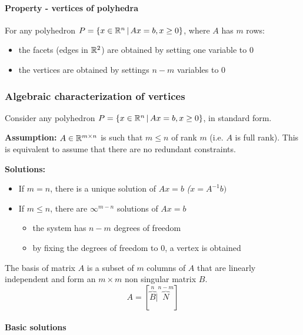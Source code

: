 \documentclass[english]{article}
\begin{document}
\paragraph{Property - vertices of polyhedra}

For any polyhedron \(P = \left\{ x \in \mathbb{R}^n \, | \, Ax = b, x \geq 0 \right\}\), where \(A\) has \(m\) rows:

\begin{itemize}
  \item the facets (edges in \(\mathbb{R}^2\)) are obtained by setting one variable to \(0\)
  \item the vertices are obtained by settings \(n-m\) variables to \(0\)
\end{itemize}

\subsubsection{Algebraic characterization of vertices}

Consider any polyhedron \(P = \left\{ x \in \mathbb{R}^n \, | \, Ax = b, x \geq 0 \right\}\), in standard form.

\textbf{Assumption:}
\(A \in \mathbb{R}^{m \times n}\) is such that \(m \leq n\) of rank \(m\) (i.e. \(A\) is full rank).
This is equivalent to assume that there are no redundant constraints.

\textbf{Solutions:}
\begin{itemize}
  \item If \(m = n\), there is a unique solution of \(Ax = b\) \textit{(\(x = A^{-1} b)\)}
  \item If \(m \leq n\), there are \(\infty^{m-n}\) solutions of \(Ax= b\)
        \begin{itemize}
          \item the system has \(n-m\) degrees of freedom
          \item by fixing the degrees of freedom to \(0\), a vertex is obtained
        \end{itemize}
\end{itemize}

\bigskip
The basis of matrix \(A\) is a subset of \(m\) columns of \(A\) that are linearly independent and form an \(m \times m\) non singular matrix \(B\).
\[ A = [ \overbrace{B}^n | \overbrace{N}^{n-m} ] \]

\paragraph{Basic solutions}
\end{document}
